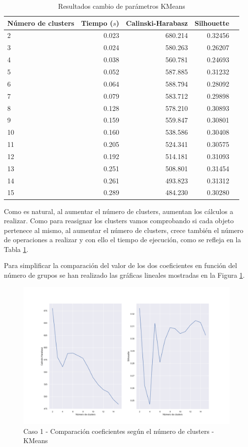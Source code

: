 \documentclass[a4paper, 20pt]{article}
\begin{document}
\begin{table}[H]
\centering
\caption{Resultados cambio de parámetros KMeans}
\label{tab:param_kmeans1}
\begin{tabular}{lrrrr}
\toprule
Número de clusters & Tiempo ($s$) & Calinski-Harabasz & Silhouette &\\
\midrule
2 & 0.023 & 680.214 & 0.32456 \\
3 & 0.024 & 580.263 & 0.26207 \\
4 & 0.038 & 560.781 & 0.24693 \\
5 & 0.052 & 587.885 & 0.31232 \\
6 & 0.064 & 588.794 & 0.28092 \\
7 & 0.079 & 583.712 & 0.29898 \\
8 & 0.128 & 578.210 & 0.30893 \\
9 & 0.159 & 559.847 & 0.30801 \\
10 & 0.160 & 538.586 & 0.30408 \\
11 & 0.205 & 524.341 & 0.30575 \\
12 & 0.192 & 514.181 & 0.31093 \\
13 & 0.251 & 508.801 & 0.31454 \\
14 & 0.261 & 493.823 & 0.31312 \\
15 & 0.289 & 484.230 & 0.30280 \\
\bottomrule
\end{tabular}
\end{table}

Como es natural, al aumentar el número de clusters, aumentan los cálculos a realizar. Como para reasignar los clusters vamos comprobando si cada objeto pertenece al mismo, al aumentar el número de clusters, crece también el número de operaciones a realizar y con ello el tiempo de ejecución, como se refleja en la Tabla \ref{tab:param_kmeans1}.

Para simplificar la comparación del valor de los dos coeficientes en función del número de grupos se han realizado las gráficas lineales mostradas en la Figura \ref{fig:param_kmeans1}.

\begin{figure}[H]
    \centering
    \includegraphics[width=1.2\textwidth, height=0.45\textheight]{./caso1/param_kmeans}
    \caption{Caso 1 - Comparación coeficientes según el número de clusters - KMeans}
    \label{fig:param_kmeans1}
\end{figure}
\end{document}
